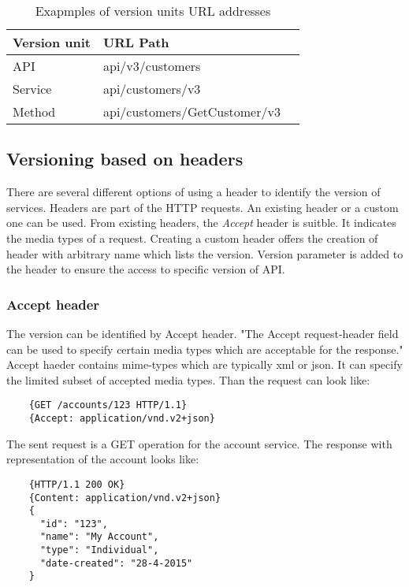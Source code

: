 \begin{table}
\caption{Exapmples of version units URL addresses}
\begin{center}
\begin{tabular}{l l l}
Version unit & URL Path  \\ \hline
API & api/v3/customers  \\
Service & api/customers/v3  \\
Method & api/customers/GetCustomer/v3  \\

\end{tabular}
\end{center}
\end{table}

\subsection{Versioning based on headers}
There are several different options of using a header to identify the version of services. Headers are part of the HTTP requests. An existing header or a custom one can be used. From existing headers, the \emph{Accept} header is suitble. It indicates the media types of a request. Creating a custom header offers the creation of header with arbitrary name which lists the version. Version parameter is added to the header to ensure the access to specific version of API.

\subsubsection{Accept header}
The version can be identified by Accept header. "The Accept request-header field can be used to specify certain media types which are acceptable for the response." \cite{website:w3} Accept haeder contains \gls{mime-types} which are typically \gls{xml} or \gls{json}. It can specify the limited subset of accepted media types. Than the request can look like:

\begin{lstlisting}
    {GET /accounts/123 HTTP/1.1}
    {Accept: application/vnd.v2+json}
\end{lstlisting}

The sent request is a GET operation for the account service. The response with representation of the account looks like:

\begin{lstlisting}
    {HTTP/1.1 200 OK}
    {Content: application/vnd.v2+json}
    {
      "id": "123",
      "name": "My Account",
      "type": "Individual",
      "date-created": "28-4-2015"
    }       
\end{lstlisting}

